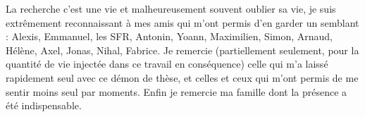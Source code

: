 La recherche c'est une vie et malheureusement souvent oublier sa vie, je suis extrêmement reconnaissant à mes amis qui m'ont permis d'en garder un semblant : Alexis, Emmanuel, les SFR, Antonin, Yoann, Maximilien, Simon, Arnaud, Hélène, Axel, Jonas, Nihal, Fabrice. Je remercie (partiellement seulement, pour la quantité de vie injectée dans ce travail en conséquence) celle qui m'a laissé rapidement seul avec ce démon de thèse, et celles et ceux qui m'ont permis de me sentir moins seul par moments. Enfin je remercie ma famille dont la présence a été indispensable.


\stars
































\endgroup